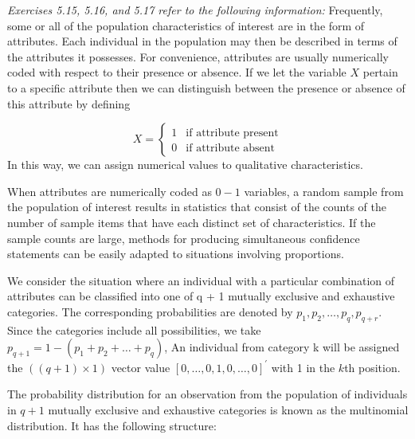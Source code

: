 \textit{Exercises 5.15, 5.16, and 5.17 refer to the following information:}
\newline
\newline
Frequently, some or all of the population characteristics of interest are in the form of
attributes. Each individual in the population may then be described in terms of the
attributes it possesses. For convenience, attributes are usually numerically coded with respect
to their presence or absence. If we let the variable $X$ pertain to a specific attribute
then we can distinguish between the presence or absence of this attribute by defining

\[
    X
    =
    \begin{cases}
        1 & \text{if attribute present} \\
        0 & \text{if attribute absent}
    \end{cases}
\]
\newline
In this way, we can assign numerical values to qualitative characteristics.
\par
When attributes are numerically coded as $0-1$ variables, a random sample from the
population of interest results in statistics that consist of the counts of the number of
sample items that have each distinct set of characteristics. If the sample counts are
large, methods for producing simultaneous confidence statements can be easily adapted
to situations involving proportions.
\par
We consider the situation where an individual with a particular combination of
attributes can be classified into one of q + 1 mutually exclusive and exhaustive
categories. The corresponding probabilities are denoted by $p_{1}, p_{2}, \dots, p_{q}, p_{q+r}$. Since
the categories include all possibilities, we take $p_{q+1} = 1 - (p_{1} + p_{2} + \dots + p_{q})$, An
individual from category k will be assigned the $( ( q + 1) \times 1 )$ vector value ${[ 0, \dots , 0, 1, 0, \dots , 0]}^{\prime}$ with 1 in the $k$th position.
\par
The probability distribution for an observation from the population of individuals in
$q + 1$ mutually exclusive and exhaustive categories is known as the multinomial distribution.
It has the following structure:

